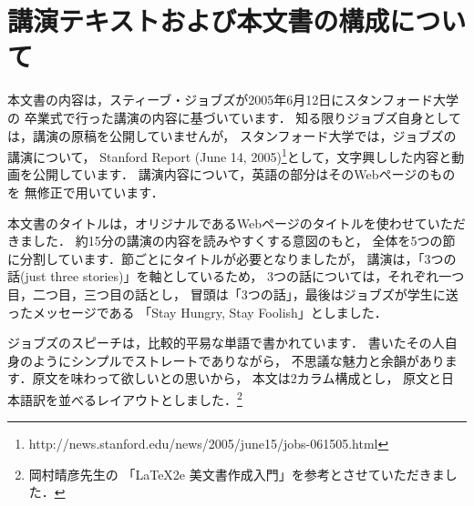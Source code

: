 \documentclass[twocolumn]{jsarticle}
\begin{document}
\section{講演テキストおよび本文書の構成について}

本文書の内容は，スティーブ・ジョブズが2005年6月12日にスタンフォード大学の
卒業式で行った講演の内容に基づいています．
知る限りジョブズ自身としては，講演の原稿を公開していませんが，
スタンフォード大学では，ジョブズの講演について，
Stanford Report (June 14, 2005)\footnote{http://news.stanford.edu/news/2005/june15/jobs-061505.html}として，文字興しした内容と動画を公開しています．
講演内容について，英語の部分はそのWebページのものを
無修正で用いています．

本文書のタイトルは，オリジナルであるWebページのタイトルを使わせていただきました．
約15分の講演の内容を読みやすくする意図のもと，
全体を5つの節に分割しています．節ごとにタイトルが必要となりましたが，
講演は，「3つの話(just three stories)」を軸としているため，
3つの話については，それぞれ一つ目，二つ目，三つ目の話とし，
冒頭は「3つの話」，最後はジョブズが学生に送ったメッセージである
「Stay Hungry, Stay Foolish」としました．

ジョブズのスピーチは，比較的平易な単語で書かれています．
書いたその人自身のようにシンプルでストレートでありながら，
不思議な魅力と余韻があります．原文を味わって欲しいとの思いから，
本文は2カラム構成とし，
原文と日本語訳を並べるレイアウトとしました．\footnote{岡村晴彦先生の
「\LaTeX2e 美文書作成入門」を参考とさせていただきました．}




\end{document}
